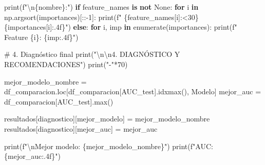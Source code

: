 \documentclass[
  doc,
  floatsintext,
  longtable,
  a4paper,
  nolmodern,
  notxfonts,
  notimes,
  12pt,
  colorlinks=true,linkcolor=blue,citecolor=blue,urlcolor=blue]{apa7}
\newenvironment{Shaded}{\begin{snugshade}}{\end{snugshade}}
\newcommand{\BuiltInTok}[1]{\textcolor[rgb]{0.00,0.23,0.31}{#1}}
\newcommand{\CharTok}[1]{\textcolor[rgb]{0.13,0.47,0.30}{#1}}
\newcommand{\CommentTok}[1]{\textcolor[rgb]{0.37,0.37,0.37}{#1}}
\newcommand{\ControlFlowTok}[1]{\textcolor[rgb]{0.00,0.23,0.31}{\textbf{#1}}}
\newcommand{\DecValTok}[1]{\textcolor[rgb]{0.68,0.00,0.00}{#1}}
\newcommand{\KeywordTok}[1]{\textcolor[rgb]{0.00,0.23,0.31}{\textbf{#1}}}
\newcommand{\NormalTok}[1]{\textcolor[rgb]{0.00,0.23,0.31}{#1}}
\newcommand{\OperatorTok}[1]{\textcolor[rgb]{0.37,0.37,0.37}{#1}}
\newcommand{\SpecialCharTok}[1]{\textcolor[rgb]{0.37,0.37,0.37}{#1}}
\newcommand{\SpecialStringTok}[1]{\textcolor[rgb]{0.13,0.47,0.30}{#1}}
\newcommand{\StringTok}[1]{\textcolor[rgb]{0.13,0.47,0.30}{#1}}
\newcommand{\VariableTok}[1]{\textcolor[rgb]{0.07,0.07,0.07}{#1}}
\begin{document}
\begin{Shaded}
\begin{Highlighting}[]
            \BuiltInTok{print}\NormalTok{(}\SpecialStringTok{f"}\CharTok{\textbackslash{}n}\SpecialCharTok{\{}\NormalTok{nombre}\SpecialCharTok{\}}\SpecialStringTok{:"}\NormalTok{)}
            \ControlFlowTok{if}\NormalTok{ feature\_names }\KeywordTok{is} \KeywordTok{not} \VariableTok{None}\NormalTok{:}
                \ControlFlowTok{for}\NormalTok{ i }\KeywordTok{in}\NormalTok{ np.argsort(importances)[::}\OperatorTok{{-}}\DecValTok{1}\NormalTok{]:}
                    \BuiltInTok{print}\NormalTok{(}\SpecialStringTok{f"  }\SpecialCharTok{\{}\NormalTok{feature\_names[i]}\SpecialCharTok{:\textless{}30\}}\SpecialStringTok{ }\SpecialCharTok{\{}\NormalTok{importances[i]}\SpecialCharTok{:.4f\}}\SpecialStringTok{"}\NormalTok{)}
            \ControlFlowTok{else}\NormalTok{:}
                \ControlFlowTok{for}\NormalTok{ i, imp }\KeywordTok{in} \BuiltInTok{enumerate}\NormalTok{(importances):}
                    \BuiltInTok{print}\NormalTok{(}\SpecialStringTok{f"  Feature }\SpecialCharTok{\{}\NormalTok{i}\SpecialCharTok{\}}\SpecialStringTok{: }\SpecialCharTok{\{}\NormalTok{imp}\SpecialCharTok{:.4f\}}\SpecialStringTok{"}\NormalTok{)}
    
    \CommentTok{\# 4. Diagnóstico final}
    \BuiltInTok{print}\NormalTok{(}\StringTok{"}\CharTok{\textbackslash{}n\textbackslash{}n}\StringTok{4. DIAGNÓSTICO Y RECOMENDACIONES"}\NormalTok{)}
    \BuiltInTok{print}\NormalTok{(}\StringTok{"{-}"}\OperatorTok{*}\DecValTok{70}\NormalTok{)}
    
\NormalTok{    mejor\_modelo\_nombre }\OperatorTok{=}\NormalTok{ df\_comparacion.loc[df\_comparacion[}\StringTok{\textquotesingle{}AUC\_test\textquotesingle{}}\NormalTok{].idxmax(), }\StringTok{\textquotesingle{}Modelo\textquotesingle{}}\NormalTok{]}
\NormalTok{    mejor\_auc }\OperatorTok{=}\NormalTok{ df\_comparacion[}\StringTok{\textquotesingle{}AUC\_test\textquotesingle{}}\NormalTok{].}\BuiltInTok{max}\NormalTok{()}
    
\NormalTok{    resultados[}\StringTok{\textquotesingle{}diagnostico\textquotesingle{}}\NormalTok{][}\StringTok{\textquotesingle{}mejor\_modelo\textquotesingle{}}\NormalTok{] }\OperatorTok{=}\NormalTok{ mejor\_modelo\_nombre}
\NormalTok{    resultados[}\StringTok{\textquotesingle{}diagnostico\textquotesingle{}}\NormalTok{][}\StringTok{\textquotesingle{}mejor\_auc\textquotesingle{}}\NormalTok{] }\OperatorTok{=}\NormalTok{ mejor\_auc}
    
    \BuiltInTok{print}\NormalTok{(}\SpecialStringTok{f"}\CharTok{\textbackslash{}n}\SpecialStringTok{Mejor modelo: }\SpecialCharTok{\{}\NormalTok{mejor\_modelo\_nombre}\SpecialCharTok{\}}\SpecialStringTok{"}\NormalTok{)}
    \BuiltInTok{print}\NormalTok{(}\SpecialStringTok{f"AUC: }\SpecialCharTok{\{}\NormalTok{mejor\_auc}\SpecialCharTok{:.4f\}}\SpecialStringTok{"}\NormalTok{)}
    

\end{Highlighting}
\end{Shaded}
\end{document}
